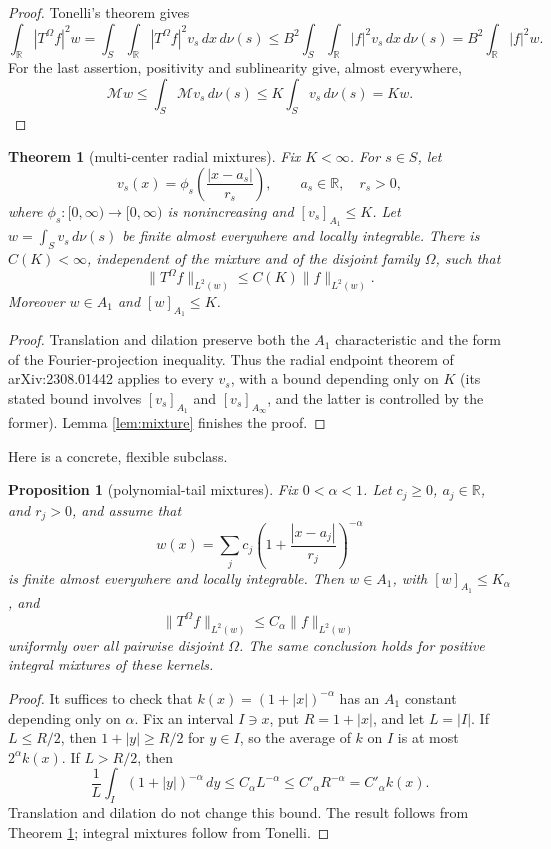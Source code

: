 \documentclass[11pt]{article}
\newtheorem{theorem}{Theorem}
\newtheorem{proposition}{Proposition}
\newcommand{\R}{\mathbb R}
\newcommand{\M}{\mathcal M}
\newcommand{\Om}{\Omega}
\begin{document}
\begin{proof}
Tonelli's theorem gives
\[
 \int_\R |T^{\Om}f|^2w
 =\int_S\int_\R |T^{\Om}f|^2v_s\,dx\,d\nu(s)
 \le B^2\int_S\int_\R |f|^2v_s\,dx\,d\nu(s)
 =B^2\int_\R|f|^2w.
\]
For the last assertion, positivity and sublinearity give, almost everywhere,
\[
 \M w\le\int_S\M v_s\,d\nu(s)
 \le K\int_Sv_s\,d\nu(s)=Kw.
\]
\end{proof}

\begin{theorem}[multi-center radial mixtures]\label{thm:main}
Fix \(K<\infty\).  For \(s\in S\), let
\[
 v_s(x)=\phi_s\!\left(\frac{|x-a_s|}{r_s}\right),
 \qquad a_s\in\R,\quad r_s>0,
\]
where \(\phi_s:[0,\infty)\to[0,\infty)\) is nonincreasing and
\([v_s]_{A_1}\le K\).  Let \(w=\int_Sv_s\,d\nu(s)\) be finite almost
everywhere and locally integrable.  There is \(C(K)<\infty\), independent of
the mixture and of the disjoint family \(\Om\), such that
\[
 \|T^{\Om}f\|_{L^2(w)}\le C(K)\|f\|_{L^2(w)}.
\]
Moreover \(w\in A_1\) and \([w]_{A_1}\le K\).
\end{theorem}

\begin{proof}
Translation and dilation preserve both the \(A_1\) characteristic and the
form of the Fourier-projection inequality.  Thus the radial endpoint theorem
of arXiv:2308.01442 applies to every \(v_s\), with a bound depending only on
\(K\) (its stated bound involves \([v_s]_{A_1}\) and
\([v_s]_{A_\infty}\), and the latter is controlled by the former).  Lemma
\ref{lem:mixture} finishes the proof.
\end{proof}

Here is a concrete, flexible subclass.

\begin{proposition}[polynomial-tail mixtures]\label{prop:kernels}
Fix \(0<\alpha<1\).  Let \(c_j\ge0\), \(a_j\in\R\), and \(r_j>0\), and
assume that
\[
 w(x)=\sum_{j}c_j
 \left(1+\frac{|x-a_j|}{r_j}\right)^{-\alpha}
\]
is finite almost everywhere and locally integrable.  Then \(w\in A_1\), with
\([w]_{A_1}\le K_\alpha\), and
\[
 \|T^{\Om}f\|_{L^2(w)}\le C_\alpha\|f\|_{L^2(w)}
\]
uniformly over all pairwise disjoint \(\Om\).  The same conclusion holds for
positive integral mixtures of these kernels.
\end{proposition}

\begin{proof}
It suffices to check that
\(k(x)=(1+|x|)^{-\alpha}\) has an \(A_1\) constant depending only on
\(\alpha\).  Fix an interval \(I\ni x\), put \(R=1+|x|\), and let
\(L=|I|\).  If \(L\le R/2\), then \(1+|y|\ge R/2\) for \(y\in I\), so
the average of \(k\) on \(I\) is at most \(2^\alpha k(x)\).  If
\(L>R/2\), then
\[
 \frac1L\int_I(1+|y|)^{-\alpha}\,dy
 \le C_\alpha L^{-\alpha}
 \le C'_\alpha R^{-\alpha}=C'_\alpha k(x).
\]
Translation and dilation do not change this bound.  The result follows from
Theorem \ref{thm:main}; integral mixtures follow from Tonelli.
\end{proof}
\end{document}
